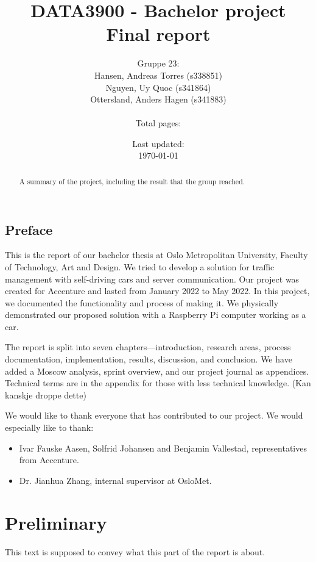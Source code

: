 \documentclass[14pt, a4paper, english]{report}
\title
{
	DATA3900 - Bachelor project \\
	Final report
}
\author{Gruppe 23:\\
    Hansen, Andreas Torres (s338851)\\
	Nguyen, Uy Quoc (s341864)\\
	Ottersland, Anders Hagen (s341883)\\
	\\Total pages: \pageref{LastPage}}
\date{Last updated:\\ \today}
\begin{document}
	
	\maketitle
	\begin{abstract}
		A summary of the project, including the result that the group reached.
	\end{abstract}
	\clearpage
	\chapter*{Preface}
This is the report of our bachelor thesis at Oslo Metropolitan University, Faculty of Technology, Art and Design. We tried to develop a solution for traffic management with self-driving cars and server communication. Our project was created for Accenture and lasted from January 2022 to May 2022. In this project, we documented the functionality and process of making it. We physically demonstrated our proposed solution with a Raspberry Pi computer working as a car. 
	
	The report is split into seven chapters—introduction, research areas, process documentation, implementation, results, discussion, and conclusion. We have added a Moscow analysis, sprint overview, and our project journal as appendices. Technical terms are in the appendix for those with less technical knowledge. (Kan kanskje droppe dette)
	
	We would like to thank everyone that has contributed to our project. We would especially like to thank:
	\begin{itemize}
		\item Ivar Fauske Aasen, Solfrid Johansen and Benjamin Vallestad, representatives from Accenture.
		\item Dr. Jianhua Zhang, internal supervisor at OsloMet.
	\end{itemize}
	\tableofcontents
	\clearpage
	\pagestyle{fancy}
	\part{Preliminary}
	This text is supposed to convey what this part of the report is about.
	
\end{document}
